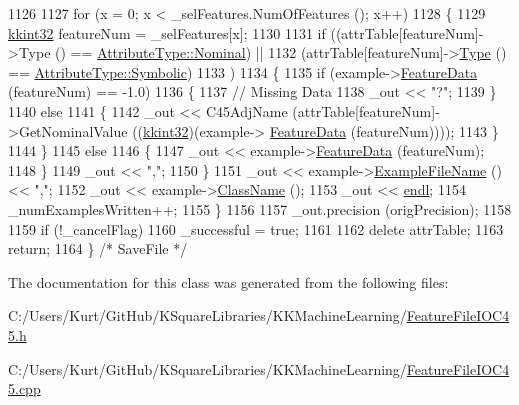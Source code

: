 \begin{DoxyCode}
1126 
1127     \textcolor{keywordflow}{for}  (x = 0; x < \_selFeatures.NumOfFeatures (); x++)
1128     \{
1129       \hyperlink{namespace_k_k_b_a8fa4952cc84fda1de4bec1fbdd8d5b1b}{kkint32}  featureNum = \_selFeatures[x];
1130 
1131       \textcolor{keywordflow}{if}  ((attrTable[featureNum]->Type () == \hyperlink{namespace_k_k_m_l_l_a99973706982b59debba670e2480555aba8c28d7c312116b8a46e2f466cb33d5b4}{AttributeType::Nominal})  ||
1132            (attrTable[featureNum]->\hyperlink{class_k_k_m_l_l_1_1_attribute_ae867c1b4e264fb7be26941730364116d}{Type} () == \hyperlink{namespace_k_k_m_l_l_a99973706982b59debba670e2480555abaaddee1396a3e20ceea8071ed6da54866}{AttributeType::Symbolic})
1133           )
1134       \{
1135         \textcolor{keywordflow}{if}  (example->\hyperlink{class_k_k_m_l_l_1_1_feature_vector_af055b7c725a4d80a31cd2f6606cc37b6}{FeatureData} (featureNum) == -1.0)
1136         \{
1137           \textcolor{comment}{// Missing Data}
1138           \_out << \textcolor{stringliteral}{"?"};
1139         \}
1140         \textcolor{keywordflow}{else}
1141         \{
1142           \_out << C45AdjName (attrTable[featureNum]->GetNominalValue ((\hyperlink{namespace_k_k_b_a8fa4952cc84fda1de4bec1fbdd8d5b1b}{kkint32})(example->
      \hyperlink{class_k_k_m_l_l_1_1_feature_vector_af055b7c725a4d80a31cd2f6606cc37b6}{FeatureData} (featureNum))));
1143         \}
1144       \}
1145       \textcolor{keywordflow}{else}
1146       \{
1147         \_out << example->\hyperlink{class_k_k_m_l_l_1_1_feature_vector_af055b7c725a4d80a31cd2f6606cc37b6}{FeatureData} (featureNum);
1148       \}
1149       \_out << \textcolor{stringliteral}{","};
1150     \}
1151     \_out << example->\hyperlink{class_k_k_m_l_l_1_1_feature_vector_ab47c89ab1e9396664fdc0dc34b6e1ab5}{ExampleFileName} () << \textcolor{stringliteral}{","};
1152     \_out << example->\hyperlink{class_k_k_m_l_l_1_1_feature_vector_a7c410c4ab70f5f2fdc8fca66ea8000ba}{ClassName} ();
1153     \_out << \hyperlink{namespace_k_k_b_ad1f50f65af6adc8fa9e6f62d007818a8}{endl};
1154     \_numExamplesWritten++;
1155   \}
1156 
1157   \_out.precision (origPrecision);
1158 
1159   \textcolor{keywordflow}{if}  (!\_cancelFlag)
1160     \_successful = \textcolor{keyword}{true};
1161 
1162   \textcolor{keyword}{delete}  attrTable;
1163   \textcolor{keywordflow}{return};
1164 \}  \textcolor{comment}{/* SaveFile */}
\end{DoxyCode}


The documentation for this class was generated from the following files\+:\begin{DoxyCompactItemize}
\item 
C\+:/\+Users/\+Kurt/\+Git\+Hub/\+K\+Square\+Libraries/\+K\+K\+Machine\+Learning/\hyperlink{_feature_file_i_o_c45_8h}{Feature\+File\+I\+O\+C45.\+h}\item 
C\+:/\+Users/\+Kurt/\+Git\+Hub/\+K\+Square\+Libraries/\+K\+K\+Machine\+Learning/\hyperlink{_feature_file_i_o_c45_8cpp}{Feature\+File\+I\+O\+C45.\+cpp}\end{DoxyCompactItemize}

